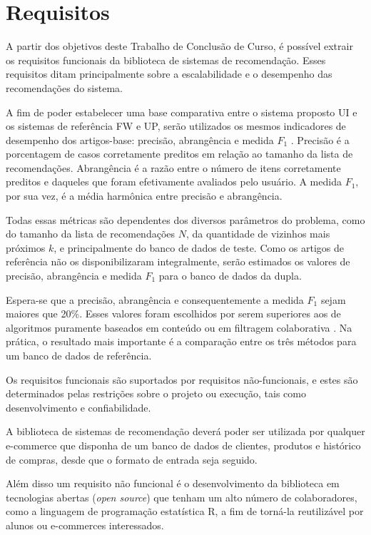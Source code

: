 \chapter[Requisitos]{Requisitos}
\label{chap:requisitos}

A partir dos objetivos deste Trabalho de Conclusão de Curso, é possível extrair os requisitos funcionais da biblioteca de sistemas de recomendação. Esses requisitos ditam principalmente sobre a escalabilidade e o desempenho das recomendações do sistema.


A fim de poder estabelecer uma base comparativa entre o sistema proposto UI e os sistemas de referência FW e UP, serão utilizados os mesmos indicadores de desempenho dos artigos-base: precisão, abrangência e medida $F_1$ \cite{symeonidis2007feature,debnath2008feature}. Precisão é a porcentagem de casos corretamente preditos em relação ao tamanho da lista de recomendações. Abrangência é a razão entre o número de itens corretamente preditos e daqueles que foram efetivamente avaliados pelo usuário. A medida $F_1$, por sua vez, é a média harmônica entre precisão e
abrangência.

Todas essas métricas são dependentes dos diversos parâmetros do problema, como do tamanho da lista de recomendações $N$, da quantidade de vizinhos mais próximos $k$, e principalmente do banco de dados de teste. Como os artigos de referência não os disponibilizaram integralmente, serão estimados os valores de precisão, abrangência e medida $F_1$ para o banco de dados da dupla. 

Espera-se que a precisão, abrangência e consequentemente a medida $F_1$ sejam maiores que 20\%. Esses valores foram escolhidos por serem superiores aos de algoritmos puramente baseados em conteúdo ou em filtragem colaborativa \cite{symeonidis2007feature,debnath2008feature}. Na prática, o resultado mais importante é a comparação entre os três métodos para um banco de dados de referência. 

Os requisitos funcionais são suportados por requisitos não-funcionais, e estes são determinados pelas restrições sobre o projeto ou execução, tais como desenvolvimento e confiabilidade.

A biblioteca de sistemas de recomendação deverá poder ser utilizada por qualquer e-commerce que disponha de um banco de dados de clientes, produtos e histórico de compras, desde que o formato de entrada seja seguido.

Além disso um requisito não funcional é o desenvolvimento da biblioteca em tecnologias abertas (\textit{open source}) que tenham um alto número de colaboradores, como a linguagem de programação estatística R, a fim de torná-la reutilizável por alunos ou e-commerces interessados.

